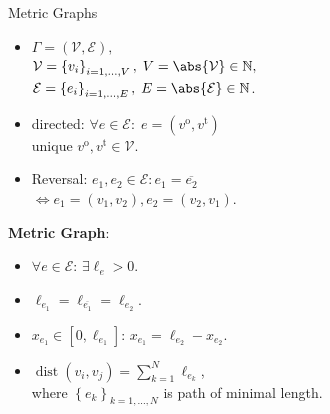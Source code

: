 \documentclass[9pt]{beamer}
\begin{document}
\begin{frame}{Metric Graphs}
    \begin{minipage}{0.5\textwidth}
        \begin{itemize}
            \item $\Gamma = \left(\mathcal{V}, \mathcal{E} \right),$ \\ $\mathcal{V} = \left\{ v_i \right\}_{i = 1, \ldots, V}, \; V = \abs{\mathcal{V}} \in \mathbb{N},$ \\
            $\mathcal{E} = \left\{ e_i \right\}_{i = 1, \ldots, E}, \; E = \abs{\mathcal{E}} \in \mathbb{N}$.
            \item directed: $\forall e \in \mathcal{E} \colon \; e = \left( v^{\operatorname{o}}, v^{\operatorname{t}} \right)$ \\
            unique $v^{\operatorname{o}}, v^{\operatorname{t}} \in \mathcal{V}$.
            \item Reversal: $e_1, e_2 \in \mathcal{E} \colon e_1 = \overline{e_2}$ \\
            $\Leftrightarrow e_1 = \left( v_1, v_2 \right), e_2 = \left( v_2, v_1 \right)$.
        \end{itemize}
        \vspace{3mm}
        \textbf{Metric Graph}:
        \begin{itemize}
            \item $\forall e \in \mathcal{E} \colon \, \exists \ell_e > 0$.
            \item $\ell_{e_1} = \ell_{\overline{e_1}} = \ell_{e_2}$.
            \item $x_{e_1} \in [0, \ell_{e_1}] \colon \, x_{e_1} = \ell_{e_2} - x_{e_2}$.
            \item $\operatorname{dist}(v_i, v_j) = \sum^{N}_{k = 1} \ell_{e_k}$, \\ where $\left\{ e_k \right\}_{k = 1, \ldots, N}$ is path of minimal length.
        \end{itemize}
    \end{minipage} \hfill
    \begin{minipage}{0.45\textwidth}
        \begin{figure}[H]
            \resizebox{40mm}{40mm}
            {
                }
\end{figure}
\end{minipage}
\end{frame}
\end{document}
